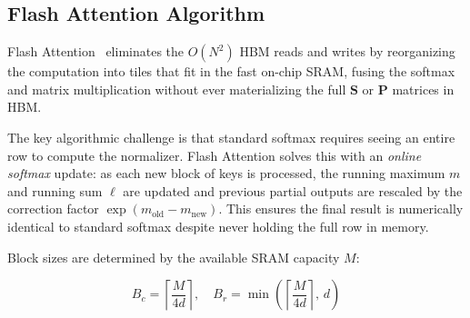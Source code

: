 \documentclass{book}
\begin{document}
\subsection{Flash Attention Algorithm}
\label{sec:flash_attention_algo}

Flash Attention~\cite{dao2022flashattention} eliminates the $O(N^2)$ HBM
reads and writes by reorganizing the computation into tiles that fit in
the fast on-chip SRAM, fusing the softmax and matrix multiplication without
ever materializing the full $\mathbf{S}$ or $\mathbf{P}$ matrices in HBM.

The key algorithmic challenge is that standard softmax requires seeing an
entire row to compute the normalizer. Flash Attention solves this with an
\emph{online softmax} update: as each new block of keys is processed, the
running maximum $m$ and running sum $\ell$ are updated and previous partial
outputs are rescaled by the correction factor $\exp(m_\text{old} -
m_\text{new})$. This ensures the final result is numerically identical to
standard softmax despite never holding the full row in memory.

Block sizes are determined by the available SRAM capacity $M$:

\begin{equation}
\label{eq:flash_blocks}
B_c = \left\lceil \frac{M}{4d} \right\rceil, \quad
B_r = \min\!\left(\left\lceil \frac{M}{4d} \right\rceil,\, d\right)
\end{equation}
\end{document}
